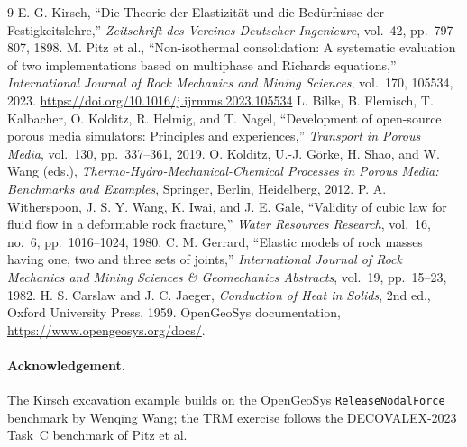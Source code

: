 \documentclass[11pt,a4paper]{tubaf-report}
\begin{document}
\begin{thebibliography}{9}
        E. G. Kirsch, ``Die Theorie der Elastizit\"at und die Bed\"urfnisse
        der Festigkeitslehre,'' \emph{Zeitschrift des Vereines Deutscher
        Ingenieure}, vol.~42, pp.~797--807, 1898.
        M. Pitz et al., ``Non-isothermal consolidation: A systematic
        evaluation of two implementations based on multiphase and Richards
        equations,'' \emph{International Journal of Rock Mechanics and
        Mining Sciences}, vol.~170, 105534, 2023.
        \url{https://doi.org/10.1016/j.ijrmms.2023.105534}
        L. Bilke, B. Flemisch, T. Kalbacher, O. Kolditz, R. Helmig, and
        T. Nagel, ``Development of open-source porous media simulators:
        Principles and experiences,'' \emph{Transport in Porous Media},
        vol.~130, pp.~337--361, 2019.
        O. Kolditz, U.-J. G\"orke, H. Shao, and W. Wang (eds.),
        \emph{Thermo-Hydro-Mechanical-Chemical Processes in Porous Media:
        Benchmarks and Examples}, Springer, Berlin, Heidelberg, 2012.
        P. A. Witherspoon, J. S. Y. Wang, K. Iwai, and J. E. Gale,
        ``Validity of cubic law for fluid flow in a deformable rock
        fracture,'' \emph{Water Resources Research}, vol.~16, no.~6,
        pp.~1016--1024, 1980.
        C. M. Gerrard, ``Elastic models of rock masses having one, two and
        three sets of joints,'' \emph{International Journal of Rock
        Mechanics and Mining Sciences \& Geomechanics Abstracts}, vol.~19,
        pp.~15--23, 1982.
        H. S. Carslaw and J. C. Jaeger, \emph{Conduction of Heat in Solids},
        2nd ed., Oxford University Press, 1959.
        OpenGeoSys documentation, \url{https://www.opengeosys.org/docs/}.
\end{thebibliography}

\paragraph{Acknowledgement.}
The Kirsch excavation example builds on the OpenGeoSys
\texttt{ReleaseNodalForce} benchmark by Wenqing Wang; the TRM exercise
follows the DECOVALEX-2023 Task~C benchmark of Pitz et al.
\end{document}
